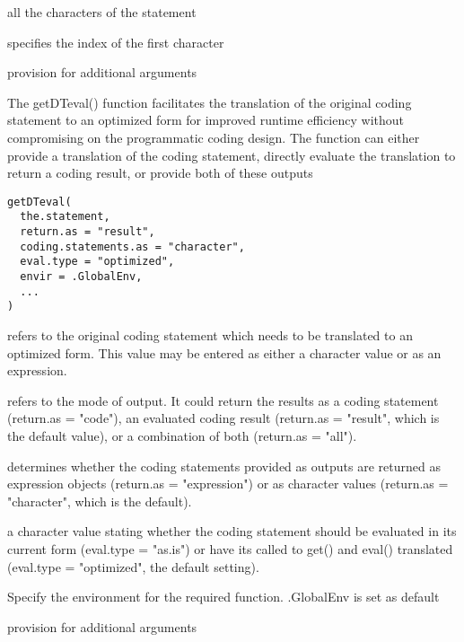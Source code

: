 \documentclass[a4paper]{book}
\begin{document}
%
\begin{Arguments}
\begin{ldescription}
\item[\code{all.chars}] all the characters of the statement

\item[\code{beginning.index}] specifies the index of the first character

\item[\code{...}] provision for additional arguments
\end{ldescription}
\end{Arguments}
%
\begin{Description}\relax
The getDTeval() function facilitates the translation of the original coding statement to an optimized form for improved runtime efficiency without compromising on the programmatic coding design.  The function can either provide a translation of the coding statement, directly evaluate the translation to return a coding result, or provide both of these outputs
\end{Description}
%
\begin{Usage}
\begin{verbatim}
getDTeval(
  the.statement,
  return.as = "result",
  coding.statements.as = "character",
  eval.type = "optimized",
  envir = .GlobalEnv,
  ...
)
\end{verbatim}
\end{Usage}
%
\begin{Arguments}
\begin{ldescription}
\item[\code{the.statement}] refers to the original coding statement which needs to be translated to an optimized form.  This value may be entered as either a character value or as an expression.

\item[\code{return.as}] refers to the mode of output. It could return the results as a coding statement (return.as = "code"), an evaluated coding result (return.as = "result", which is the default value), or a combination of both (return.as = "all").

\item[\code{coding.statements.as}] determines whether the coding statements provided as outputs are returned as expression objects (return.as = "expression") or as character values (return.as = "character", which is the default).

\item[\code{eval.type}] a character value stating whether the coding statement should be evaluated in its current form (eval.type = "as.is") or have its called to get() and eval() translated (eval.type = "optimized", the default setting).

\item[\code{envir}] Specify the environment for the required function. .GlobalEnv is set as default

\item[\code{...}] provision for additional arguments
\end{ldescription}
\end{Arguments}
\end{document}
